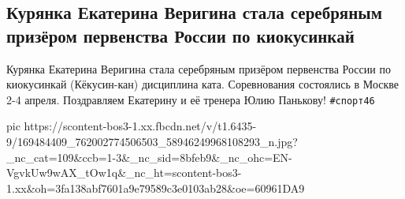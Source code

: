  
 
 
 
 

\subsection{Курянка Екатерина Веригина стала серебряным призёром первенства России по киокусинкай}

Курянка Екатерина Веригина стала серебряным призёром первенства России по
киокусинкай (Кёкусин-кан) дисциплина ката. Соревнования состоялись в Москве 2-4
апреля. Поздравляем Екатерину и её тренера Юлию Панькову! \verb|#спорт46|

\ifcmt
  pic https://scontent-bos3-1.xx.fbcdn.net/v/t1.6435-9/169484409_762002774506503_58946249968108293_n.jpg?_nc_cat=109&ccb=1-3&_nc_sid=8bfeb9&_nc_ohc=EN-VgvkUw9wAX_tOw1q&_nc_ht=scontent-bos3-1.xx&oh=3fa138abf7601a9e79589c3e0103ab28&oe=60961DA9
\fi

